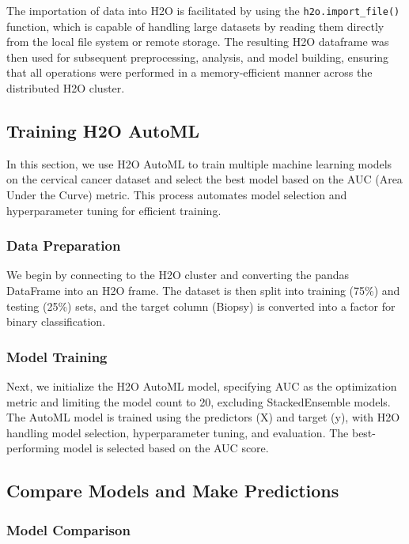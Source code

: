 \documentclass{llncs}
\begin{document}
The importation of data into H2O is facilitated by using the \texttt{h2o.import\_file()} function, which is capable of handling large datasets by reading them directly from the local file system or remote storage. The resulting H2O dataframe was then used for subsequent preprocessing, analysis, and model building, ensuring that all operations were performed in a memory-efficient manner across the distributed H2O cluster.

\subsection{Training H2O AutoML}

In this section, we use H2O AutoML to train multiple machine learning models on the cervical cancer dataset and select the best model based on the AUC (Area Under the Curve) metric. This process automates model selection and hyperparameter tuning for efficient training.

\subsubsection{Data Preparation}

We begin by connecting to the H2O cluster and converting the pandas DataFrame into an H2O frame. The dataset is then split into training (75\%) and testing (25\%) sets, and the target column (Biopsy) is converted into a factor for binary classification.

\subsubsection{Model Training}

Next, we initialize the H2O AutoML model, specifying AUC as the optimization metric and limiting the model count to 20, excluding StackedEnsemble models. The AutoML model is trained using the predictors (X) and target (y), with H2O handling model selection, hyperparameter tuning, and evaluation. The best-performing model is selected based on the AUC score.

\subsection{Compare Models and Make Predictions}

\subsubsection{Model Comparison}
\end{document}
